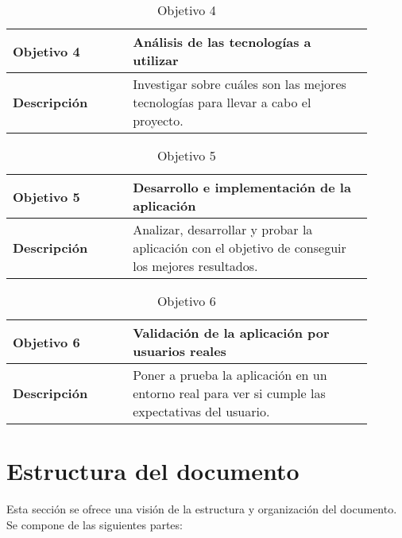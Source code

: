 \begin{table}[htb!]
	\centering %
	\begin{tabular}{|p{0.3\linewidth}|p{0.6\linewidth}|}
		\hline %
		\rowcolor{grayshade} 
		\textbf{Objetivo 4} & \textbf{Análisis de las tecnologías a utilizar} \\
		\hline %
		\textbf{Descripción} & Investigar sobre cuáles son las mejores tecnologías para llevar a cabo el proyecto.  \\
		\hline
	\end{tabular}
	\caption{Objetivo 4}
\end{table}

\begin{table}[htb!]
	\centering %
	\begin{tabular}{|p{0.3\linewidth}|p{0.6\linewidth}|}
		\hline %
		\rowcolor{grayshade} 
		\textbf{Objetivo 5} & \textbf{Desarrollo e implementación de la aplicación} \\
		\hline %
		\textbf{Descripción} & Analizar, desarrollar y probar la aplicación con el objetivo de conseguir los mejores resultados.  \\
		\hline
	\end{tabular}
	\caption{Objetivo 5}
\end{table}

\begin{table}[htb!]
	\centering %
	\begin{tabular}{|p{0.3\linewidth}|p{0.6\linewidth}|}
		\hline %
		\rowcolor{grayshade} 
		\textbf{Objetivo 6} & \textbf{Validación de la aplicación por usuarios reales} \\
		\hline %
		\textbf{Descripción} & Poner a prueba la aplicación en un entorno real para ver si cumple las expectativas del usuario.  \\
		\hline
	\end{tabular}
	\caption{Objetivo 6}
\end{table}

\section{Estructura del documento}
\label{sec:document_structure}
Esta sección se ofrece una visión de la estructura y organización del documento. Se compone de las siguientes partes: 

